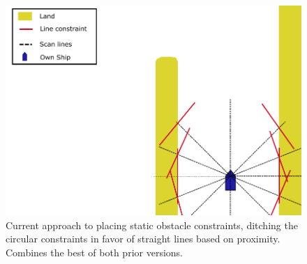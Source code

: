 
\begin{figure}[hb!]
    \centering
    \includegraphics[width=\textwidth]{Images/StaticObs_lines.pdf}
    \caption{Current approach to placing static obstacle constraints, 
    ditching the circular constraints in favor of straight lines based on proximity. 
    Combines the best of both prior versions.}     \label{FIG: Static Obs Lines}
\end{figure} 


